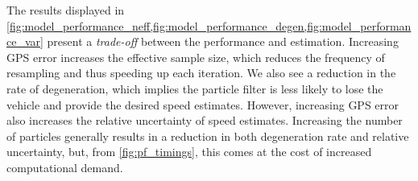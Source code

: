 The results displayed in \cref{fig:model_performance_neff,fig:model_performance_degen,fig:model_performance_var} present a \emph{trade-off} between the performance and estimation. Increasing GPS error increases the effective sample size, which reduces the frequency of resampling and thus speeding up each iteration. We also see a reduction in the rate of degeneration, which implies the particle filter is less likely to lose the vehicle and provide the desired speed estimates. However, increasing GPS error also increases the relative uncertainty of speed estimates. Increasing the number of particles generally results in a reduction in both degeneration rate and relative uncertainty, but, from \cref{fig:pf_timings}, this comes at the cost of increased computational demand.
